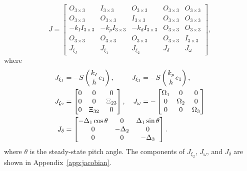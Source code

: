 \begin{equation}
    J \!=\! \begin{bmatrix}
        O_{3 \times 3} & I_{3 \times 3} & O_{3 \times 3} & O_{3 \times 3} & O_{3 \times 3} \\
        O_{3 \times 3} & O_{3 \times 3} & I_{3 \times 3} & O_{3 \times 3} & O_{3 \times 3} \\
        -k_I I_{3 \times 3}\!\!\! & -k_p I_{3 \times 3}\!\!\! & -k_d I_{3 \times 3}\!\!\!\! & O_{3 \times 3} & O_{3 \times 3} \\
        O_{3 \times 3} & O_{3 \times 3} & O_{3 \times 3} & O_{3 \times 3} & I_{3 \times 3} \\
        J_{\xi_I} & J_{\xi_1} & J_{\xi_2} & J_{\delta} & J_{\omega}
    \end{bmatrix}, \label{eq:handpos_trajectory_jacobian}
\end{equation}
where
\begin{subequations}
    \begin{align}
        J_{\xi_I} &= -S\left(\frac{k_I}{h}e_1\right), &
        J_{\xi_1} &= -S\left(\frac{k_p}{h}e_1\right), \\
        J_{\xi_2} &= \begin{bmatrix}
            0 & 0 & 0 \\
            0 & 0 & \Xi_{23} \\
            0 & \Xi_{32} & 0
        \end{bmatrix}, &
        J_{\omega} &= - \begin{bmatrix}
            \Omega_1 & 0 & 0 \\
            0 & \Omega_2 & 0 \\
            0 & 0 & \Omega_3
        \end{bmatrix} \\            
        J_{\delta} &= \mathrlap{\begin{bmatrix}
            -\Delta_1\cos\theta & 0 & \Delta_1\sin\theta \\
            0 & -\Delta_2 & 0 \\
            0 & 0 & -\Delta_3
        \end{bmatrix}.}            
    \end{align}
    \label{eq:handpos_trajectory_jacobian_blocks}
\end{subequations}
where $\theta$ is the steady-state pitch angle.
The components of $J_{\xi_2}$, $J_{\omega}$, and $J_{\delta}$ are shown in Appendix~\ref{app:jacobian}.

